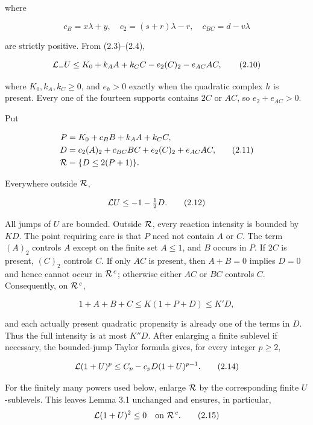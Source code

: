 where

\[
 c_B=x\lambda+y,\quad
 c_2=(s+r)\lambda-r,\quad
 c_{BC}=d-v\lambda                                      \tag{2.9}
\]

are strictly positive. From (2.3)--(2.4),

\[
 {\cal L}_{-}U
 \le K_0+k_AA+k_CC-e_2(C)_2-e_{AC}AC,                    \tag{2.10}
\]

where \(K_0,k_A,k_C\ge0\), and \(e_h>0\) exactly when the quadratic
complex \(h\) is present. Every one of the fourteen supports contains
\(2C\) or \(AC\), so \(e_2+e_{AC}>0\).

Put

\[
\begin{split}
 P&=K_0+c_BB+k_AA+k_CC,\\
 D&=c_2(A)_2+c_{BC}BC+e_2(C)_2+e_{AC}AC,\\
 {\cal R}&=\{D\le2(P+1)\}.
\end{split}                                               \tag{2.11}
\]

Everywhere outside \({\cal R}\),

\[
 {\cal L}U\le-1-\tfrac12D.                              \tag{2.12}
\]

All jumps of \(U\) are bounded. Outside \({\cal R}\), every reaction
intensity is bounded by \(KD\). The point requiring care is that \(P\)
need not contain \(A\) or \(C\). The term \((A)_2\) controls \(A\)
except on the finite set \(A\le1\), and \(B\) occurs in \(P\). If \(2C\)
is present, \((C)_2\) controls \(C\). If only \(AC\) is present, then
\(A+B=0\) implies \(D=0\) and hence cannot occur in \({\cal R}^{\,c}\);
otherwise either \(AC\) or \(BC\) controls \(C\). Consequently, on
\({\cal R}^{\,c}\),

\[
 1+A+B+C\le K(1+P+D)\le K'D,                            \tag{2.13}
\]

and each actually present quadratic propensity is already one of the
terms in \(D\). Thus the full intensity is at most \(K''D\). After
enlarging a finite sublevel if necessary, the bounded-jump Taylor
formula gives, for every integer \(p\ge2\),

\[
 {\cal L}(1+U)^p
 \le C_p-c_pD(1+U)^{p-1}.                                \tag{2.14}
\]

For the finitely many powers used below, enlarge \({\cal R}\) by the
corresponding finite \(U\)-sublevels. This leaves Lemma 3.1 unchanged
and ensures, in particular, \[
 {\cal L}(1+U)^2\le0\quad\hbox{on }{\cal R}^{\,c}.         \tag{2.15}
\]


